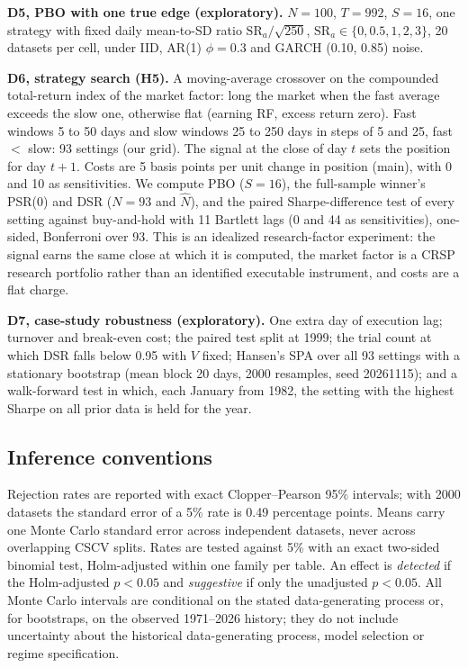 \documentclass[11pt,a4paper]{article}
\theoremstyle{remark}
\begin{document}
\textbf{D5, PBO with one true edge (exploratory).} $N=100$, $T=992$, $S=16$, one strategy with fixed daily mean-to-SD ratio $\mathrm{SR}_a/\sqrt{250}$, $\mathrm{SR}_a\in\{0,0.5,1,2,3\}$, 20 datasets per cell, under IID, AR(1) $\phi=0.3$ and GARCH (0.10, 0.85) noise.

\textbf{D6, strategy search (H5).} A moving-average crossover on the compounded total-return index of the market factor: long the market when the fast average exceeds the slow one, otherwise flat (earning RF, excess return zero). Fast windows 5 to 50 days and slow windows 25 to 250 days in steps of 5 and 25, fast $<$ slow: 93 settings (our grid). The signal at the close of day $t$ sets the position for day $t+1$. Costs are 5 basis points per unit change in position (main), with 0 and 10 as sensitivities. We compute PBO ($S=16$), the full-sample winner's PSR(0) and DSR ($N=93$ and $\hat N$), and the paired Sharpe-difference test of every setting against buy-and-hold with 11 Bartlett lags (0 and 44 as sensitivities), one-sided, Bonferroni over 93. This is an idealized research-factor experiment: the signal earns the same close at which it is computed, the market factor is a CRSP research portfolio rather than an identified executable instrument, and costs are a flat charge.

\textbf{D7, case-study robustness (exploratory).} One extra day of execution lag; turnover and break-even cost; the paired test split at 1999; the trial count at which DSR falls below 0.95 with $V$ fixed; Hansen's SPA over all 93 settings with a stationary bootstrap (mean block 20 days, 2000 resamples, seed 20261115); and a walk-forward test in which, each January from 1982, the setting with the highest Sharpe on all prior data is held for the year.

\subsection{Inference conventions}
Rejection rates are reported with exact Clopper--Pearson 95\% intervals; with 2000 datasets the standard error of a 5\% rate is 0.49 percentage points. Means carry one Monte Carlo standard error across independent datasets, never across overlapping CSCV splits. Rates are tested against 5\% with an exact two-sided binomial test, Holm-adjusted within one family per table. An effect is \emph{detected} if the Holm-adjusted $p<0.05$ and \emph{suggestive} if only the unadjusted $p<0.05$. All Monte Carlo intervals are conditional on the stated data-generating process or, for bootstraps, on the observed 1971--2026 history; they do not include uncertainty about the historical data-generating process, model selection or regime specification.
\end{document}
